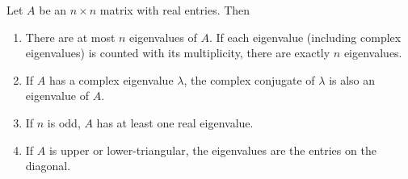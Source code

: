 \begin{theorem} Let $A$ be an $n\times n$ matrix with real entries. Then
\begin{enumerate}
\item There are at most $n$ eigenvalues of $A$. If each eigenvalue (including complex eigenvalues) is counted with its multiplicity, there are exactly $n$ eigenvalues.
\item If $A$ has a complex eigenvalue $\lambda$, the complex conjugate of $\lambda$ is also an eigenvalue of $A$.
\item If $n$ is odd, $A$ has at least one real eigenvalue.
\item If $A$ is upper or lower-triangular, the eigenvalues are the entries on the diagonal.
\end{enumerate}
\end{theorem}



\label{sec:egspace_geom}

